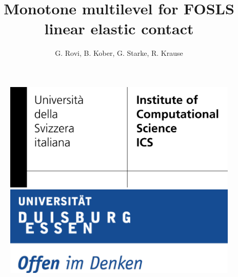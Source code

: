 \documentclass[8pt, oneside]{beamer}   	%
\title{ \textcolor{dkgrey}{  \textbf{Monotone multilevel for FOSLS linear elastic contact} }}
\author{\textcolor{dkgrey}{G. Rovi, B. Kober, G. Starke, R. Krause}}
\institute{Universit\"at Duisburg\,-\,Essen, Germany \\ Universit\aaa~della Svizzera italiana, Switzerland}
\begin{document}
 \begin{frame}
\titlepage
\begin{figure}[htbp!]
	\includegraphics[scale=0.7]{img/logo_ics}
	\quad
		\includegraphics[scale=0.3]{img/essenlogo}
\end{figure}
\end{frame}








 
\end{document}
